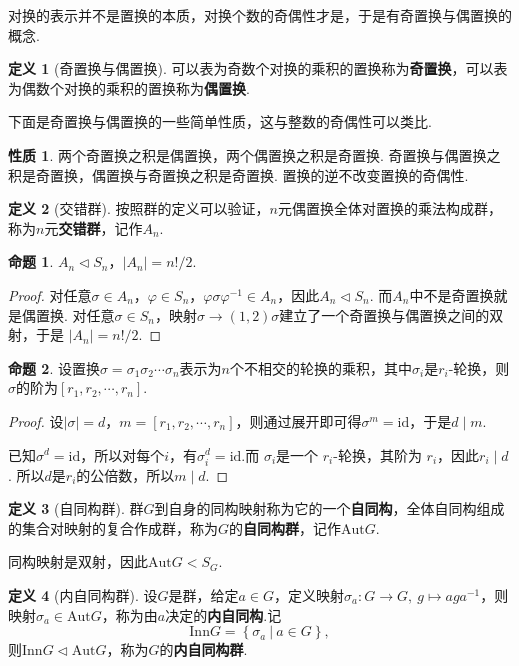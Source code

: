 \documentclass[12pt]{ctexart}
\theoremstyle{definition}
\newtheorem{definition}{定义}
\newtheorem{property}{性质}
\newtheorem{proposition}{命题}
\theoremstyle{plain}
\newcommand{\id}{\mathrm{id}}
\newcommand{\Aut}{\mathrm{Aut}}
\newcommand{\Inn}{\mathrm{Inn}}
\begin{document}
	对换的表示并不是置换的本质，对换个数的奇偶性才是，于是有奇置换与偶置换的概念.
	\begin{definition}[奇置换与偶置换]
		可以表为奇数个对换的乘积的置换称为\textbf{奇置换}，可以表为偶数个对换的乘积的置换称为\textbf{偶置换}.
	\end{definition}
	下面是奇置换与偶置换的一些简单性质，这与整数的奇偶性可以类比.
	\begin{property}\label{oddeven}
		两个奇置换之积是偶置换，两个偶置换之积是奇置换. 奇置换与偶置换之积是奇置换，偶置换与奇置换之积是奇置换. 置换的逆不改变置换的奇偶性.
	\end{property}
	\begin{definition}[交错群]
		按照群的定义可以验证，$n$元偶置换全体对置换的乘法构成群，称为$n$元\textbf{交错群}，记作$A_n$.
	\end{definition}
	\begin{proposition}
		$A_n\lhd S_n$，$|A_n|=n!/2$.
	\end{proposition}
	\begin{proof}
		对任意$\sigma\in A_n$，$\varphi\in S_n$，$\varphi\sigma\varphi^{-1}\in A_n$，因此$A_n\lhd S_n$. 而$A_n$中不是奇置换就是偶置换. 对任意$\sigma\in S_n$，映射$\sigma\to (1,2)\sigma$建立了一个奇置换与偶置换之间的双射，于是
		$|A_n|=n!/2$.
	\end{proof}
	\begin{proposition}
		设置换$\sigma=\sigma_1\sigma_2\cdots\sigma_n$表示为$n$个不相交的轮换的乘积，其中$\sigma_i$是$r_i$-轮换，则$\sigma$的阶为$\left[r_1,r_2,\cdots,r_n\right]$.
	\end{proposition}
	\begin{proof}
		设$|\sigma|=d$，$m=\left[r_1,r_2,\cdots,r_n\right]$，则通过展开即可得$\sigma^m=\id$，于是$d\mid m$. 
		
		已知$\sigma^d = \text{id}$，所以对每个$i$，有$\sigma_i^d = \text{id}$.而 $\sigma_i$是一个 $r_i$-轮换，其阶为 $r_i$，因此$r_i \mid d$. 所以$d$是$r_i$的公倍数，所以$m\mid d$.
	\end{proof}
	\begin{definition}[自同构群]
		群$G$到自身的同构映射称为它的一个\textbf{自同构}，全体自同构组成的集合对映射的复合作成群，称为$G$的\textbf{自同构群}，记作$\Aut G$.
	\end{definition}
	同构映射是双射，因此$\Aut G<S_G$.
	\begin{definition}[内自同构群]
		设$G$是群，给定$a\in G$，定义映射$\sigma_a:G\to G,\ g\mapsto aga^{-1}$，则映射$\sigma_a\in\Aut G$，称为由$a$决定的\textbf{内自同构}.记
		$$\Inn G=\left\{\sigma_a\ |\ a\in G\right\},$$
		则$\Inn G\lhd\Aut G$，称为$G$的\textbf{内自同构群}.
	\end{definition}
\end{document}

